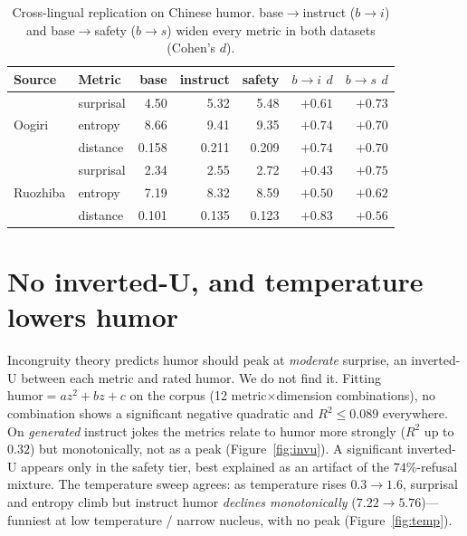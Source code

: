 \documentclass{article}
\begin{document}
\begin{table}[t]
  \caption{Cross-lingual replication on Chinese humor. base$\to$instruct ($b{\to}i$) and base$\to$safety ($b{\to}s$) widen every metric in both datasets (Cohen's $d$).}
  \label{tab:zh}
  \centering
  \begin{tabular}{llrrrrr}
    \toprule
    Source & Metric & base & instruct & safety & $b{\to}i$ $d$ & $b{\to}s$ $d$ \\
    \midrule
    \multirow{3}{*}{Oogiri}   & surprisal & 4.50  & 5.32  & 5.48  & $+0.61$ & $+0.73$ \\
                              & entropy   & 8.66  & 9.41  & 9.35  & $+0.74$ & $+0.70$ \\
                              & distance  & 0.158 & 0.211 & 0.209 & $+0.74$ & $+0.70$ \\
    \midrule
    \multirow{3}{*}{Ruozhiba} & surprisal & 2.34  & 2.55  & 2.72  & $+0.43$ & $+0.75$ \\
                              & entropy   & 7.19  & 8.32  & 8.59  & $+0.50$ & $+0.62$ \\
                              & distance  & 0.101 & 0.135 & 0.123 & $+0.83$ & $+0.56$ \\
    \bottomrule
  \end{tabular}
\end{table}


\section{No inverted-U, and temperature lowers humor}
\label{sec:invu}

Incongruity theory predicts humor should peak at \emph{moderate} surprise, an inverted-U between each metric and rated humor. We do not find it. Fitting $\text{humor}=az^2+bz+c$ on the corpus (12 metric$\times$dimension combinations), no combination shows a significant negative quadratic and $R^2\le0.089$ everywhere. On \emph{generated} instruct jokes the metrics relate to humor more strongly ($R^2$ up to $0.32$) but monotonically, not as a peak (Figure~\ref{fig:invu}). A significant inverted-U appears only in the safety tier, best explained as an artifact of the $74\%$-refusal mixture. The temperature sweep agrees: as temperature rises $0.3\to1.6$, surprisal and entropy climb but instruct humor \emph{declines monotonically} ($7.22\to5.76$)---funniest at low temperature / narrow nucleus, with no peak (Figure~\ref{fig:temp}).
\end{document}
